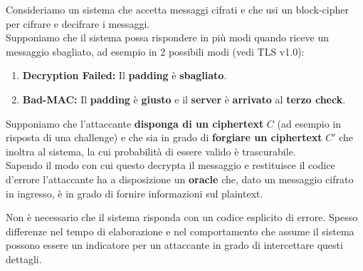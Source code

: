 \begin{definition}\label{def:padoracle}
Consideriamo un sistema che accetta messaggi cifrati e che usi un block-cipher per cifrare e decifrare i messaggi.\\
Supponiamo che il sistema possa rispondere in più modi quando riceve un messaggio sbagliato, ad esempio in 2 possibili modi (vedi TLS v1.0):
\begin{enumerate}
    \item \textbf{Decryption Failed:} Il \textbf{padding} è \textbf{sbagliato}.
    \item \textbf{Bad-MAC:} Il \textbf{padding} è \textbf{giusto} e il \textbf{server} è \textbf{arrivato} al \textbf{terzo check}.
\end{enumerate}
Supponiamo che l'attaccante \textbf{disponga di un ciphertext} $C$ (ad esempio in risposta di una challenge) e che sia in grado di \textbf{forgiare un ciphertext} $C'$ che inoltra al sistema, la cui probabilità di essere valido è trascurabile\footnotemark.\\
Sapendo il modo con cui questo decrypta il messaggio e restituisce il codice d'errore l'attaccante ha a disposizione un \textbf{oracle} che, dato un messaggio cifrato in ingresso, è in grado di fornire informazioni sul plaintext.
\end{definition}
\begin{remark}
Non è necessario che il sistema risponda con un codice esplicito di errore. Spesso differenze nel tempo di elaborazione e nel comportamento che assume il sistema possono essere un indicatore per un attaccante in grado di intercettare questi dettagli.
\end{remark}
